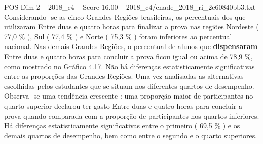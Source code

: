 \begin{textsample}{POS Dim 2 – 2018\_c4 – Score 16.00 – 2018\_c4/enade\_2018\_ri\_2e60840bb3.txt}
Considerando -se as cinco Grandes Regiões brasileiras, os percentuais dos que utilizaram Entre duas e quatro horas para finalizar a prova nas regiões Nordeste ( 77,0 \% ), Sul ( 77,4 \% ) e Norte ( 75,3 \% ) foram inferiores ao percentual nacional.
Nas demais Grandes Regiões, o percentual de alunos que \textbf{dispensaram} Entre duas e quatro horas para concluir a prova ficou igual ou acima de 78,9 \%, como mostrado no Gráfico 4.17.
Não há diferenças estatisticamente significativas entre as proporções das Grandes Regiões.
Uma vez analisadas as alternativas escolhidas pelos estudantes que se situam nos diferentes quartos de desempenho.
Observa -se uma tendência crescente : uma proporção maior de participantes no quarto superior declarou ter gasto Entre duas e quatro horas para concluir a prova quando comparada com a proporção de participantes nos quartos inferiores.
Há diferenças estatisticamente significativas entre o primeiro ( 69,5 \% ) e os demais quartos de desempenho, bem como entre o segundo e o quarto superiores.

\end{textsample}
